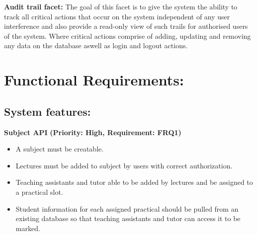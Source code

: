 \documentclass[12pt]{article}
\begin{document}
	\textbf{Audit trail facet:}
	\vspace{0.1in}
	The goal of this facet is to give the system the ability to track all critical actions that occur on the system independent of any user interference and also provide a read-only view of such trails for authorised users of the system. Where critical actions comprise of adding, updating and removing any data on the database aswell as login and logout actions.  
	
	\vspace{0.5in}
	
	\newpage
	\section{Functional Requirements:}
	\vspace{0.2in}
		
		\subsection{System features:} %
		\vspace{0.15in}
		
		\hspace{0.2in}\textbf{Subject API}
		\newline\textbf{(Priority: High, Requirement: FRQ1)}
		\begin{itemize}
			\item A subject must be creatable.
			\item Lectures must be added to subject by users with correct authorization.
			\item Teaching assistants and tutor able to be added by lectures and be assigned to a practical slot.
			\item Student information for each assigned practical should be pulled from an existing database so that
					teaching assistants and tutor can access it to be marked.
		\end{itemize}
		
		\vspace{0.15in}
		
\end{document}
